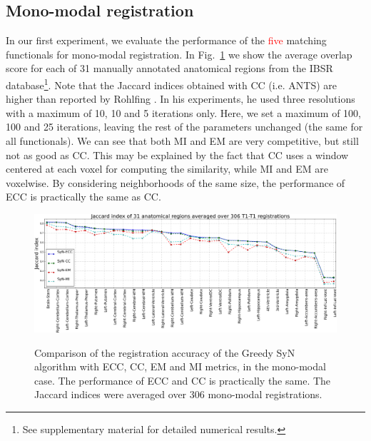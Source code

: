 \subsection{Mono-modal registration}
In our first experiment, we evaluate the performance of the \textcolor{red}{five} matching functionals for mono-modal registration. In \hbox{Fig. \ref{fig:mono_graph_seg}} we show the average overlap score for each of 31 manually annotated anatomical regions from the IBSR database\footnote{See supplementary material for detailed numerical results.}. Note that the Jaccard indices obtained with CC (i.e. ANTS) are higher than reported by Rohlfing \cite{Rohlfing2012}. In his experiments, he used three resolutions with a maximum of 10, 10 and 5 iterations only. Here, we set a maximum of 100, 100 and 25 iterations, leaving the rest of the parameters unchanged (the same for all functionals). We can see that both MI and EM are very competitive, but still not as good as CC. This may be explained by the fact that CC uses a window centered at each voxel for computing the similarity, while MI and EM are voxelwise. By considering neighborhoods of the same size, the performance of ECC is practically the same as CC.
%
%

\begin{figure}[t!]
\centering
\includegraphics[width=0.95\linewidth]{images/mono_lines_seg.png}\\
\caption{{\small Comparison of the registration accuracy of the Greedy SyN algorithm with ECC, CC, EM and MI metrics, in the mono-modal case. The performance of ECC and CC is practically the same. The Jaccard indices were averaged over 306 mono-modal registrations.}}
\label{fig:mono_graph_seg}\figcloser
\end{figure}

